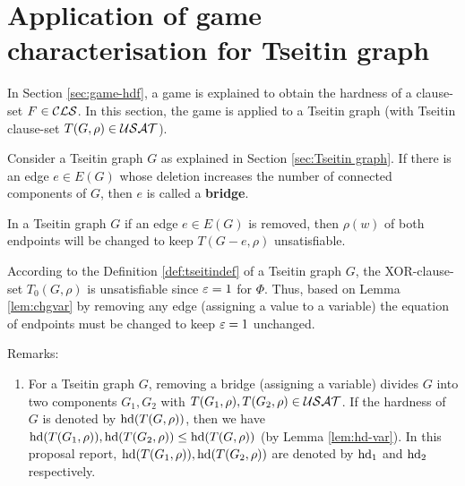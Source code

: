 \documentclass{report}
\begin{document}
\section{Application of game characterisation for Tseitin graph}
\label{sec:appgame}

In Section \ref{sec:game-hdf}, a game is explained to obtain the hardness of a clause-set $F \in \mathcal{CLS}$. In this section, the game is applied to a Tseitin graph (with Tseitin clause-set $T(G,\rho) \in \mathcal{USAT}$). 

 
\begin{defi}\label{def:bridge}
Consider a Tseitin graph $G$ as explained in Section \ref{sec:Tseitin graph}. If there is an edge $e \in E(G)$ whose deletion increases the number of connected components of $G$, then $e$ is called a \textbf{bridge}.
\end{defi} 

\begin{lem}\label{lem:game3}
In a Tseitin graph $G$ if an edge $e \in E(G)$ is removed, then $\rho(w)$ of both endpoints will be changed to keep $T(G-e,\rho)$ unsatisfiable. 
\end{lem}
\begin{prf}
According to the Definition \ref{def:tseitindef} of a Tseitin graph $G$, the XOR-clause-set $T_0(G,\rho)$ is unsatisfiable since $\varepsilon=1$ for $\Phi$. Thus, based on Lemma \ref{lem:chgvar} by removing any edge (assigning a value to a variable) the equation of endpoints must be changed to keep $\varepsilon=1$ unchanged.
\end{prf}
Remarks:
  \begin{enumerate}
  \item For a Tseitin graph $G$, removing a bridge (assigning a variable) divides $G$ into two components $G_1,G_2 $ with $T(G_1,\rho), T(G_2,\rho) \in \mathcal{USAT}$. If the hardness of $G$ is denoted by $\operatorname{hd}(T(G,\rho))$, then we have $\operatorname{hd}(T(G_1,\rho)), \operatorname{hd}(T(G_2,\rho)) \le \operatorname{hd}(T(G,\rho)) $ (by Lemma \ref{lem:hd-var}). In this proposal  report,  $\operatorname{hd}(T(G_1,\rho)), \operatorname{hd}(T(G_2,\rho))$ are denoted by  $\operatorname{hd}_1$ and $\operatorname{hd}_2$ respectively.
\end{enumerate}
\end{document}
